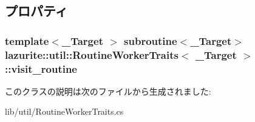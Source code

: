 \subsection{プロパティ}
\hypertarget{classlazurite_1_1util_1_1_routine_worker_traits_3_01___target_01_4_a1e22bc3f89da1f9a397aad0d8b48483a}{
\subsubsection[{visit\_\-routine}]{\setlength{\rightskip}{0pt plus 5cm}template$<$\_\-Target $>$ subroutine$<$\_\-Target$>$ lazurite::util::RoutineWorkerTraits$<$ \_\-Target $>$::visit\_\-routine}}
\label{classlazurite_1_1util_1_1_routine_worker_traits_3_01___target_01_4_a1e22bc3f89da1f9a397aad0d8b48483a}


このクラスの説明は次のファイルから生成されました:\begin{DoxyCompactItemize}
\item 
lib/util/RoutineWorkerTraits.cs\end{DoxyCompactItemize}
